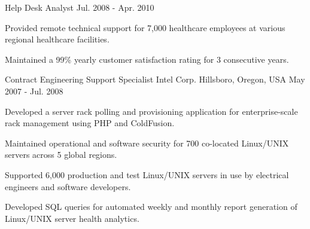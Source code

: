 \begin{cventries}
  \cventry
    {Help Desk Analyst} %
    {} %
    {} %
    {Jul. 2008 - Apr. 2010} %
    {
      \begin{cvitems} %
        \item {Provided remote technical support for 7,000 healthcare employees at various regional healthcare facilities.}
        \item {Maintained a 99\% yearly customer satisfaction rating for 3 consecutive years.}
      \end{cvitems}
    }

  \cventry
    {Contract Engineering Support Specialist} %
    {Intel Corp.} %
    {Hillsboro, Oregon, USA} %
    {May 2007 - Jul. 2008} %
    {
      \begin{cvitems} %
        \item {Developed a server rack polling and provisioning application for enterprise-scale rack management using PHP and ColdFusion.}
        \item {Maintained operational and software security for 700 co-located Linux/UNIX servers across 5 global regions.}
        \item {Supported 6,000 production and test Linux/UNIX servers in use by electrical engineers and software developers.}
        \item {Developed SQL queries for automated weekly and monthly report generation of Linux/UNIX server health analytics.}
      \end{cvitems}
    }

\end{cventries}
